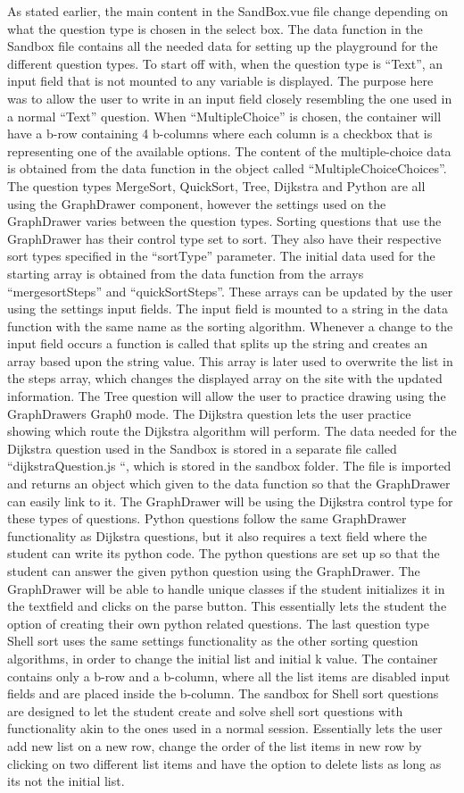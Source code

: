 As stated earlier, the main content in the SandBox.vue file change depending on what the question type is chosen in the select box. The data function in the Sandbox file contains all the needed data for setting up the playground for the different question types. To start off with, when the question type is “Text”, an input field that is not mounted to any variable is displayed. The purpose here was to allow the user to write in an input field closely resembling the one used in a normal “Text” question. When “MultipleChoice” is chosen, the container will have a b-row containing 4 b-columns where each column is a checkbox that is representing one of the available options. The content of the multiple-choice data is obtained from the data function in the object called “MultipleChoiceChoices”. The question types MergeSort, QuickSort, Tree, Dijkstra and Python are all using the GraphDrawer component, however the settings used on the GraphDrawer varies between the question types. Sorting questions that use the GraphDrawer has their control type set to sort. They also have their respective sort types specified in the “sortType” parameter. The initial data used for the starting array is obtained from the data function from the arrays “mergesortSteps” and “quickSortSteps”. These arrays can be updated by the user using the settings input fields. The input field is mounted to a string in the data function with the same name as the sorting algorithm. Whenever a change to the input field occurs a function is called that splits up the string and creates an array based upon the string value. This array is later used to overwrite the list in the steps array, which changes the displayed array on the site with the updated information. The Tree question will allow the user to practice drawing using the GraphDrawers Graph0 mode. The Dijkstra question lets the user practice showing which route the Dijkstra algorithm will perform. The data needed for the Dijkstra question used in the Sandbox is stored in a separate file called “dijkstraQuestion.js “, which is stored in the sandbox folder. The file is imported and returns an object which given to the data function so that the GraphDrawer can easily link to it. The GraphDrawer will be using the Dijkstra control type for these types of questions. Python questions follow the same GraphDrawer functionality as Dijkstra questions, but it also requires a text field where the student can write its python code. The python questions are set up so that the student can answer the given python question using the GraphDrawer. The GraphDrawer will be able to handle unique classes if the student initializes it in the textfield and clicks on the parse button. This essentially lets the student the option of creating their own python related questions. The last question type Shell sort uses the same settings functionality as the other sorting question algorithms, in order to change the initial list and initial k value. The container contains only a b-row and a b-column, where all the list items are disabled input fields and are placed inside the b-column. The sandbox for Shell sort questions are designed to let the student create and solve shell sort questions with functionality akin to the ones used in a normal session. Essentially lets the user add new list on a new row, change the order of the list items in new row by clicking on two different list items and have the option to delete lists as long as its not the initial list.

